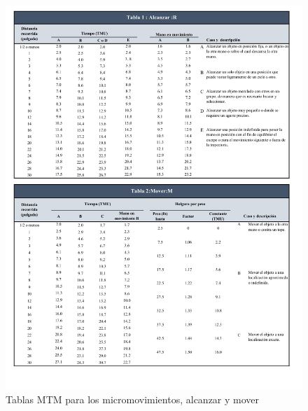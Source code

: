    
    \begin{figure}[H]
        \centering
        \includegraphics[trim = {5mm 5mm 1mm 1mm},clip,scale=0.3]{22/Img/tablasMTM1.pdf}
        \caption{Tablas MTM para los micromovimientos, alcanzar y mover}
        \label{tablaMTM1}
    \end{figure}
    
